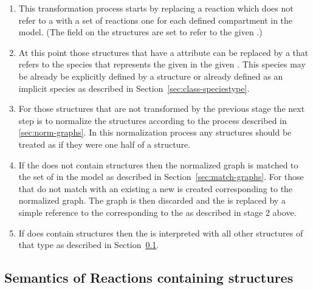 \documentclass{cekarticle}
\begin{document}
\begin{enumerate}

\item This transformation process starts by replacing a reaction
which does not refer to a  with a set of
reactions one for each defined compartment in the model.  (The
 field on the 
structures are set to refer to the given .)

\item At this point those 
structures that have a  attribute can be
replaced by a  that refers to the species that
represents the given  in the given
.  This species may be already be explicitly
defined by a  structure or already defined as an
implicit species as described in
Section~\ref{sec:class-speciestype}.

\item For those  structures that are
not transformed by the previous stage the next step is to
normalize the  structures according
to the process described in \ref{sec:norm-graphs}.  In this
normalization process any  structures should be
treated as if they were one half of a 
structure.

\item If the  does not contain 
structures then the normalized graph is matched to the set of
 in the model as described in
Section~\ref{sec:match-graphs}.  For those that do not match with
an existing  a new  is
created corresponding to the normalized graph.  The graph is then
discarded and the  is replaced by a
simple reference to the  corresponding to the
 as described in stage 2 above.

\item If  does contain 
structures then the  is interpreted with all other
 structures of that type as described in
Section~\ref{sec:reaction-semantics-GBs}.

\end{enumerate}

\subsection{Semantics of Reactions containing  structures}
\label{sec:reaction-semantics-GBs}
\end{document}
